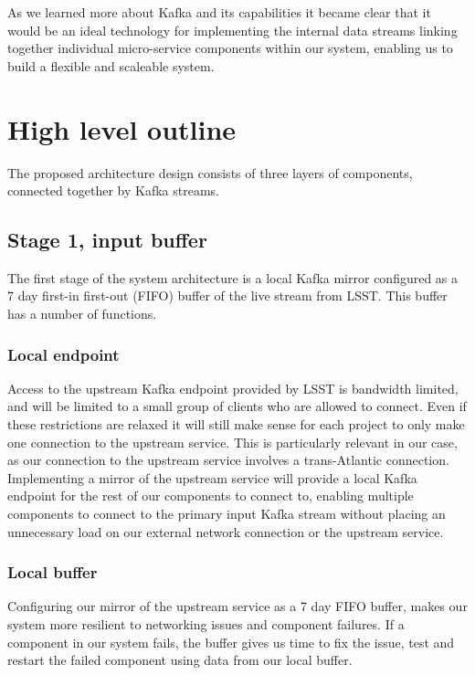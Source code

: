 \documentclass{article}
\newcommand{\scaleable} {scaleable\xspace}
\newcommand{\kafka} {Kafka\xspace}
\newcommand{\fifo} {FIFO\xspace}
\newcommand{\lsst} {LSST\xspace}
\begin{document}
As we learned more about \kafka and its capabilities it became clear that it would be an ideal technology for implementing the internal data streams linking together individual micro-service components within our system, enabling us to build a flexible and \scaleable system.

\section{High level outline}
\label{high-level-outline}

The proposed architecture design consists of three layers of components, connected together by \kafka streams.

\subsection{Stage 1, input buffer}
\label{stage-1}

The first stage of the system architecture is a local \kafka mirror configured as a 7 day first-in first-out (\fifo) buffer of the live stream from \lsst. This buffer has a number of functions.

\subsubsection{Local endpoint}
\label{stage-1.local-endpoint}
Access to the upstream \kafka endpoint provided by \lsst is bandwidth limited, and will be limited to a small group of clients who are allowed to connect. Even if these restrictions are relaxed it will still make sense for each project to only make one connection to the upstream service.
This is particularly relevant in our case, as our connection to the upstream service involves a trans-Atlantic connection.
Implementing a mirror of the upstream service will provide a local \kafka endpoint for the rest of our components to connect to, enabling multiple components to connect to the primary input \kafka stream without placing an unnecessary load on our external network connection or the upstream service.

\subsubsection{Local buffer}
\label{stage-1.local-buffer}
Configuring our mirror of the upstream service as a 7 day \fifo buffer, makes our system more resilient to networking issues and component failures.
If a component in our system fails, the buffer gives us time to fix the issue, test and restart the failed component using data from our local buffer.
\end{document}
